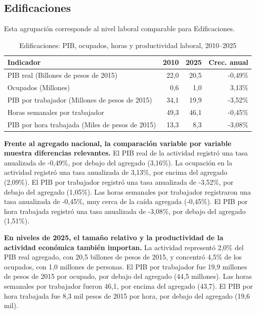 \subsection{Edificaciones}

Esta agrupación corresponde al nivel laboral comparable para Edificaciones.

\begin{table}[H]
\centering
\caption{Edificaciones: PIB, ocupados, horas y productividad laboral, 2010--2025}
\label{tab:agg25_f01_productividad}
\small
\begin{tabular}{lrrr}
\toprule
Indicador & 2010 & 2025 & Crec. anual \\
\midrule
PIB real  (Billones de pesos de 2015) & 22,0 & 20,5 & -0,49\% \\
Ocupados (Millones) & 0,6 & 1,0 & 3,13\% \\
PIB por trabajador (Millones de pesos de 2015) & 34,1 & 19,9 & -3,52\% \\
Horas semanales por trabajador & 49,3 & 46,1 & -0,45\% \\
PIB por hora trabajada (Miles de pesos de 2015) & 13,3 & 8,3 & -3,08\% \\
\bottomrule
\end{tabular}
\end{table}

\textbf{Frente al agregado nacional, la comparación variable por variable muestra diferencias relevantes.} El PIB real de la actividad registró una tasa anualizada de -0,49\%, por debajo del agregado (3,16\%). La ocupación en la actividad registró una tasa anualizada de 3,13\%, por encima del agregado (2,09\%). El PIB por trabajador registró una tasa anualizada de -3,52\%, por debajo del agregado (1,05\%). Las horas semanales por trabajador registraron una tasa anualizada de -0,45\%, muy cerca de la caída agregada (-0,45\%). El PIB por hora trabajada registró una tasa anualizada de -3,08\%, por debajo del agregado (1,51\%).

\textbf{En niveles de 2025, el tamaño relativo y la productividad de la actividad económica también importan.} La actividad representó 2,0\% del PIB real agregado, con 20,5 billones de pesos de 2015, y concentró 4,5\% de los ocupados, con 1,0 millones de personas. El PIB por trabajador fue 19,9 millones de pesos de 2015 por ocupado, por debajo del agregado (44,5 millones). Las horas semanales por trabajador fueron 46,1, por encima del agregado (43,7). El PIB por hora trabajada fue 8,3 mil pesos de 2015 por hora, por debajo del agregado (19,6 mil).

